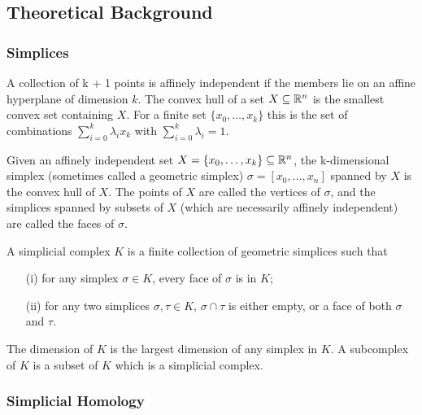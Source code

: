 \subsection{Theoretical Background}


\subsubsection{Simplices}

A collection of k + 1 points is affinely independent if the members lie on an affine hyperplane of dimension $k$. The convex hull of a set $X \subseteq \mathbb{R}^n$ is the smallest convex set containing $X$. For a finite set $\{x_0, \ldots, x_k\}$ this is the set of combinations $\sum_{i=0}^k \lambda_i x_k$ with $\sum_{i=0}^k\lambda_i = 1$.

\begin{definition}
    Given an affinely independent set $X = \{x_0, \ldots, x_k\} \subseteq \mathbb{R}^n$, the k-dimensional simplex (sometimes called a geometric simplex) $\sigma = [x_0, \ldots, x_n]$ spanned by $X$ is the convex hull of $X$. The points of $X$ are called the vertices of $\sigma$, and the simplices spanned by subsets of $X$ (which are necessarily affinely independent) are called the faces of $\sigma$.
\end{definition}

\begin{definition}
    A simplicial complex $K$ is a finite collection of geometric simplices such that
    \begin{itemize}
        \item[(i)] for any simplex $\sigma \in K$, every face of $\sigma$ is in $K$;
        \item[(ii)] for any two simplices $\sigma, \tau \in K$, $\sigma \cap \tau$ is either empty, or a face of both $\sigma$ and $\tau$.
    \end{itemize}
\end{definition}

The dimension of $K$ is the largest dimension of any simplex in $K$. A subcomplex of $K$ is a subset of $K$ which is a simplicial complex.


\subsubsection{Simplicial Homology}

